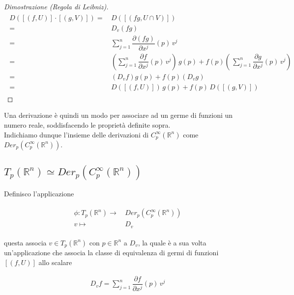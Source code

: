 \begin{proof}[Dimostrazione (Regola di Leibniz)]
	\begin{align}
		\begin{split}
			D ([(f,U)] \cdot [(g,V)]) =& \, D ([(f g,U \cap V)])\\
			=& \, D_{v} (f g)\\
			=& \, \sum_{j=1}^{n} \dfrac{\partial (f g)}{\partial x^{j}} (p) \, v^{j}\\
			=& \, \left( \sum_{j=1}^{n} \dfrac{\partial f}{\partial x^{j}} (p) \, v^{j} \right) \, g(p) + f(p) \left( \, \sum_{j=1}^{n} \dfrac{\partial g}{\partial x^{j}} (p) \, v^{j} \right)\\
			=& \, (D_{v} f) g(p) + f(p) (D_{v} g)\\
			=& \, D ([(f,U)]) \, g(p) + f(p) \, D ([(g,V)])
		\end{split}
	\end{align}
\end{proof}

Una derivazione è quindi un modo per associare ad un germe di funzioni un numero reale, soddisfacendo le proprietà definite sopra.\\
Indichiamo dunque l'insieme delle derivazioni di $ C_{p}^{\infty}(\mathbb{R}^{n}) $ come $ Der_{p}(C_{p}^{\infty}(\mathbb{R}^{n})) $.

\subsection{$ T_{p}(\mathbb{R}^{n}) \simeq Der_{p}(C_{p}^{\infty}(\mathbb{R}^{n})) $}

Definisco l'applicazione

\begin{align}
	\begin{split}
		\phi : T_{p}(\mathbb{R}^{n}) \to& \, Der_{p}(C_{p}^{\infty}(\mathbb{R}^{n}))\\
		v \mapsto& \, D_{v}
	\end{split}
\end{align}

questa associa $ v \in T_{p}(\mathbb{R}^{n}) $ con $ p \in \mathbb{R}^{n} $ a $ D_{v} $, la quale è a sua volta un'applicazione che associa la classe di equivalenza di germi di funzioni $ [(f,U)] $ allo scalare

\begin{align}
	D_{v} f = \sum_{j=1}^{n} \dfrac{\partial f}{\partial x^{j}} (p) \, v^{j}
\end{align}

